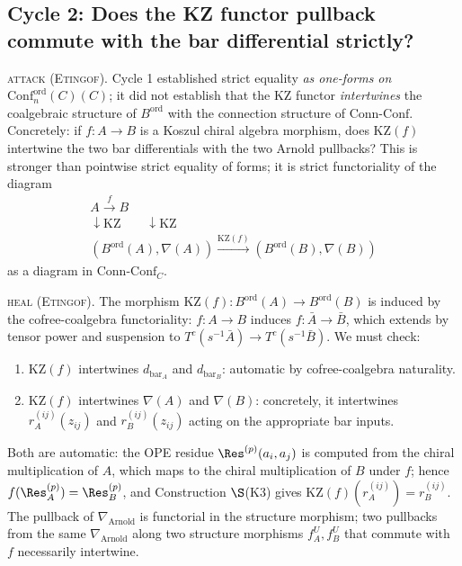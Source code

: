 \documentclass[12pt]{article}
\providecommand{\KZ}{\mathrm{KZ}}
\providecommand{\Arn}{\mathrm{Arnold}}
\providecommand{\Confnord}[1][C]{\mathrm{Conf}_n^{\mathrm{ord}}(#1)}
\providecommand{\dbar}{d_{\mathrm{bar}}}
\providecommand{\BarOrd}{B^{\mathrm{ord}}}
\providecommand{\ConnConf}{\mathrm{Conn\text{-}Conf}}
\theoremstyle{definition}
\begin{document}

\subsection{Cycle 2: Does the KZ functor pullback commute with
the bar differential strictly?}
\label{ssec:cycle-2}

\textsc{attack (Etingof).}
Cycle 1 established strict equality \emph{as one-forms on
$\Confnord(C)$}; it did not establish that the KZ functor
\emph{intertwines} the coalgebraic structure of $\BarOrd$ with
the connection structure of $\ConnConf$.  Concretely: if
$f \colon A \to B$ is a Koszul chiral algebra morphism,
does $\KZ(f)$ intertwine the two bar differentials with the two
Arnold pullbacks?  This is stronger than pointwise strict
equality of forms; it is strict functoriality of the diagram
\[
\begin{array}{c}
   A \xrightarrow{f} B
   \\[0.5em]
   \downarrow \KZ \qquad \downarrow \KZ
   \\[0.5em]
   (\BarOrd(A), \nabla(A)) \xrightarrow{\KZ(f)} (\BarOrd(B), \nabla(B))
\end{array}
\]
as a diagram in $\ConnConf_{C}$.

\textsc{heal (Etingof).}
The morphism $\KZ(f) \colon \BarOrd(A) \to \BarOrd(B)$ is induced
by the cofree-coalgebra functoriality: $f \colon A \to B$
induces $f \colon \bar A \to \bar B$, which extends by tensor
power and suspension to
$T^{c}(s^{-1}\bar A) \to T^{c}(s^{-1}\bar B)$.  We must check:

\begin{enumerate}[label=\textup{(i)}]
\item $\KZ(f)$ intertwines $\dbar_A$ and $\dbar_B$: automatic by
cofree-coalgebra naturality.
\item $\KZ(f)$ intertwines $\nabla(A)$ and $\nabla(B)$:
concretely, it intertwines $r_A^{(ij)}(z_{ij})$ and
$r_B^{(ij)}(z_{ij})$ acting on the appropriate bar inputs.
\end{enumerate}

Both are automatic: the OPE residue $\Res^{(p)}(a_i, a_j)$
is computed from the chiral multiplication of $A$, which maps
to the chiral multiplication of $B$ under $f$; hence
$f(\Res^{(p)}_A) = \Res^{(p)}_B$, and Construction
$\S$(K3) gives $\KZ(f)(r_A^{(ij)}) = r_B^{(ij)}$.
The pullback of $\nabla_{\Arn}$ is functorial in the structure
morphism; two pullbacks from the same $\nabla_{\Arn}$ along two
structure morphisms $f_A^{U}, f_B^{U}$ that commute with $f$
necessarily intertwine.
\end{document}

